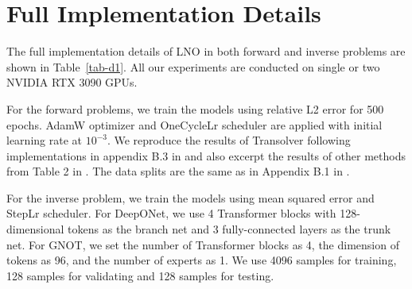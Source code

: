 \documentclass{article}
\begin{document}
\section{Full Implementation Details}
\label{appendix-D}
The full implementation details of LNO in both forward and inverse problems are shown in Table~\ref{tab-d1}.  All our experiments are conducted on single or two NVIDIA RTX 3090 GPUs. 

For the forward problems, we train the models using relative L2 error for 500 epochs. AdamW optimizer\cite{AdamW} and OneCycleLr scheduler\cite{OneCycleLR} are applied with initial learning rate at $10^{-3}$. We reproduce the results of Transolver\cite{Transolver} following implementations in appendix B.3 in \cite{Transolver} and also excerpt the results of other methods from Table 2 in \cite{Transolver}. The data splits are the same as in Appendix B.1 in \cite{Transolver}.

For the inverse problem, we train the models using mean squared error and StepLr scheduler. For DeepONet\cite{DeepONet}, we use 4 Transformer blocks with 128-dimensional tokens as the branch net and 3 fully-connected layers as the trunk net. For GNOT\cite{GNOT}, we set the number of Transformer blocks as 4, the dimension of tokens as 96, and the number of experts as 1. We use 4096 samples for training, 128 samples for validating and 128 samples for testing.

\begin{table}[htbp]
\centering
\caption{The hyperparameters and training configuration of LNO in solving the forward and inverse problems in Section \ref{forward-exp} and \ref{inverse-exp}}
\label{tab-d1}
\end{table}
\end{document}
